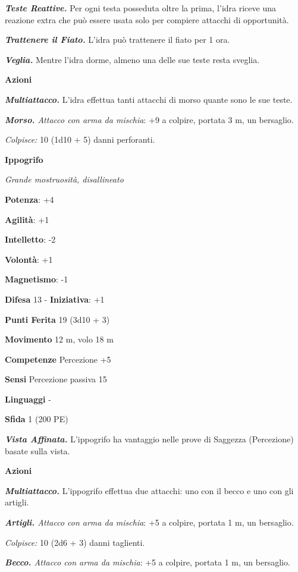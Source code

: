 \begin{multicols}{2}
\emph{\textbf{Teste Reattive.}} Per ogni testa posseduta oltre la prima,
l'idra riceve una reazione extra che può essere usata solo per compiere
attacchi di opportunità.

\emph{\textbf{Trattenere il Fiato.}} L'idra può trattenere il fiato per
1 ora.

\emph{\textbf{Veglia.}} Mentre l'idra dorme, almeno una delle sue teste
resta sveglia.

\smallskip\textbf{Azioni}

\emph{\textbf{Multiattacco.}} L'idra effettua tanti attacchi di morso
quante sono le sue teste.

\emph{\textbf{Morso.} Attacco con arma da mischia}: +9 a colpire,
portata 3 m, un bersaglio.

\emph{Colpisce:} 10 (1d10 + 5) danni perforanti.

\textbf{Ippogrifo}

\emph{Grande mostruosità, disallineato}

\textbf{Potenza}: +4

\textbf{Agilità}: +1

\textbf{Intelletto}: -2

\textbf{Volontà}: +1

\textbf{Magnetismo}: -1

\textbf{Difesa} 13 - \textbf{Iniziativa}: +1

\textbf{Punti Ferita} 19 (3d10 + 3)

\textbf{Movimento} 12 m, volo 18 m

\textbf{Competenze} Percezione +5

\textbf{Sensi} Percezione passiva 15

\textbf{Linguaggi} -

\textbf{Sfida} 1 (200 PE)\smallskip

\emph{\textbf{Vista Affinata.}} L'ippogrifo ha vantaggio nelle prove di
Saggezza (Percezione) basate sulla vista.

\smallskip\textbf{Azioni}

\emph{\textbf{Multiattacco.}} L'ippogrifo effettua due attacchi: uno con
il becco e uno con gli artigli.

\emph{\textbf{Artigli.} Attacco con arma da mischia}: +5 a colpire,
portata 1 m, un bersaglio.

\emph{Colpisce:} 10 (2d6 + 3) danni taglienti.

\emph{\textbf{Becco.} Attacco con arma da mischia}: +5 a colpire,
portata 1 m, un bersaglio.


\end{multicols}
